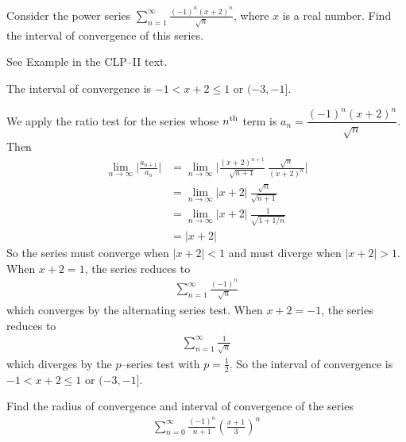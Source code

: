 \begin{question}[2013A]
 Consider the power series
 $\displaystyle\sum\limits_{n=1}^\infty \frac{(-1)^n(x+2)^n}{\sqrt{n}}$,
where $x$ is a real number. Find the interval of
convergence of this series.
\end{question}

\begin{hint}
See Example  in the
CLP--II text.
\end{hint}

\begin{answer}
The interval of convergence
is $-1<x+2\le 1$ or $(-3,-1]$.
\end{answer}

\begin{solution}
We apply the ratio test for the series whose $n^{\rm th}$
term is $a_n=\dfrac{(-1)^n(x+2)^n}{\sqrt{n}}$. Then
\begin{align*}
\lim_{n\rightarrow\infty}\bigg|\frac{a_{n+1}}{a_n}\bigg|
&=\lim_{n\rightarrow\infty} \bigg|\frac{(x+2)^{n+1}}{\sqrt{n+1}}
                                  \ \frac{\sqrt{n}}{(x+2)^n}\bigg| \\
&=\lim_{n\rightarrow\infty} |x+2|\ \frac{\sqrt{n}}{\sqrt{n+1}} \\
&=\lim_{n\rightarrow\infty} |x+2|\ \frac{1}{\sqrt{1+1/n}} \\
&=|x+2|
\end{align*}
So the series must converge when $|x+2|<1$ and must diverge when $|x+2|>1$.
When $x+2=1$, the series reduces to
\begin{align*}
\sum_{n=1}^\infty \frac{(-1)^n}{\sqrt{n}}
\end{align*}
which converges by the alternating series test.
When $x+2=-1$, the series reduces to
\begin{align*}
\sum_{n=1}^\infty \frac{1}{\sqrt{n}}
\end{align*}
which diverges by the $p$--series test with $p=\frac{1}{2}$.
So the interval of convergence is $-1<x+2\le 1$ or $(-3,-1]$.

\end{solution}

\begin{Mquestion}[2016Q5]
Find the radius of convergence and interval of convergence of the series
\begin{align*}
\sum_{n=0}^{\infty} \frac{(-1)^n}{n+1} \left(\frac{x+1}{3}\right)^n
\end{align*}
\end{Mquestion}

